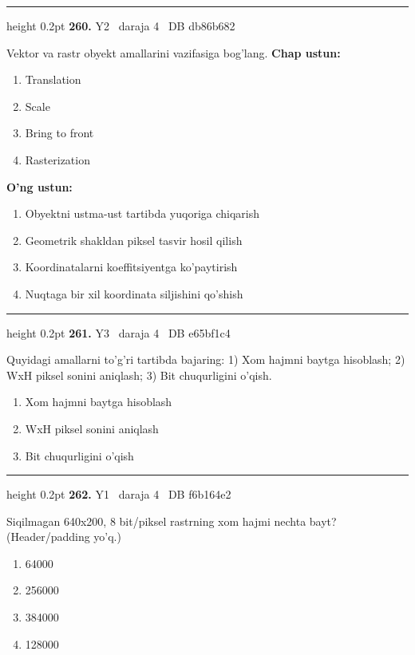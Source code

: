 \documentclass[10pt,a4paper,oneside]{article}
\begin{document}
\vspace{2mm}\hrule height 0.2pt \vspace{4mm}
\hypertarget{q260}{\textbf{\color{ink}260.}}  {\color{muted}\scriptsize Y2 \textbullet\ daraja 4 \textbullet\ DB db86b682}
\par
Vektor va rastr obyekt amallarini vazifasiga bog'lang.
\textbf{\footnotesize Chap ustun:}
\begin{enumerate}[label=\arabic*),leftmargin=9mm]
\item Translation
\item Scale
\item Bring to front
\item Rasterization
\end{enumerate}
\textbf{\footnotesize O'ng ustun:}
\begin{enumerate}[label=\Alph*),leftmargin=9mm]
\item Obyektni ustma-ust tartibda yuqoriga chiqarish
\item Geometrik shakldan piksel tasvir hosil qilish
\item Koordinatalarni koeffitsiyentga ko'paytirish
\item Nuqtaga bir xil koordinata siljishini qo'shish
\end{enumerate}
\vspace{2mm}\hrule height 0.2pt \vspace{4mm}
\hypertarget{q261}{\textbf{\color{ink}261.}}  {\color{muted}\scriptsize Y3 \textbullet\ daraja 4 \textbullet\ DB e65bf1c4}
\par
Quyidagi amallarni to'g'ri tartibda bajaring: 1) Xom hajmni baytga hisoblash; 2) WxH piksel sonini aniqlash; 3) Bit chuqurligini o'qish.
\begin{enumerate}[label=\Alph*),leftmargin=9mm]
\item Xom hajmni baytga hisoblash
\item WxH piksel sonini aniqlash
\item Bit chuqurligini o'qish
\end{enumerate}
\vspace{2mm}\hrule height 0.2pt \vspace{4mm}
\hypertarget{q262}{\textbf{\color{ink}262.}}  {\color{muted}\scriptsize Y1 \textbullet\ daraja 4 \textbullet\ DB f6b164e2}
\par
Siqilmagan 640x200, 8 bit/piksel rastrning xom hajmi nechta bayt? (Header/padding yo'q.)
\begin{enumerate}[label=\Alph*),leftmargin=9mm]
\item 64000
\item 256000
\item 384000
\item 128000
\end{enumerate}
\end{document}

